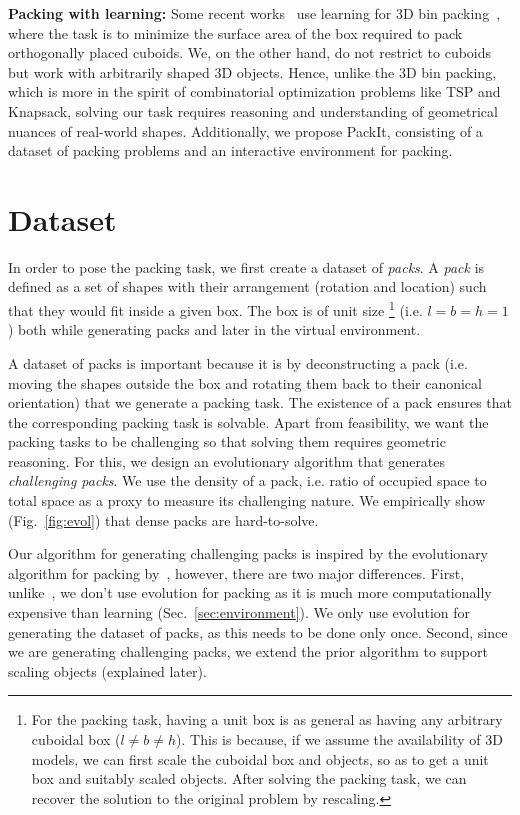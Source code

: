 \documentclass{article}
\begin{document}
\noindent \textbf{Packing with learning:} Some recent works~\cite{hu2017solving,laterre2018ranked} use learning for 3D bin packing~\cite{martello2000three}, where the task is to minimize the surface area of the box required to pack orthogonally placed cuboids. We, on the other hand, do not restrict to cuboids but work with arbitrarily shaped 3D objects. Hence, unlike the 3D bin packing, which is more in the spirit of combinatorial optimization problems like TSP and Knapsack, solving our task requires reasoning and understanding of geometrical nuances of real-world shapes. Additionally, we propose PackIt, consisting of a dataset of packing problems and an interactive environment for packing.

\section{Dataset}
\label{sec:dataset}
In order to pose the packing task, we first create a dataset of \textit{packs}. A \textit{pack} is defined as a set of shapes with their arrangement (rotation and location) such that they would fit inside a given box. The box is of unit size \footnote{ \label{box} For the packing task, having a unit box is as general as having any arbitrary cuboidal box ($l \neq b \neq h$). This is because, if we assume the availability of 3D models, we can first scale the cuboidal box and objects, so as to get a unit box and suitably scaled objects. After solving the packing task, we can recover the solution to the original problem by rescaling.} (i.e. $l=b=h=1$) both while generating packs and later in the virtual environment.

A dataset of packs is important because it is by deconstructing a pack (i.e. moving the shapes outside the box and rotating them back to their canonical orientation) that we generate a packing task. The existence of a pack ensures that the corresponding packing task is solvable. Apart from feasibility, we want the packing tasks to be challenging so that solving them requires geometric reasoning. For this, we design an evolutionary algorithm that generates \textit{challenging packs}. We use the density of a pack, i.e. ratio of occupied space to total space as a proxy to measure its challenging nature. We empirically show (Fig.~\ref{fig:evol}) that dense packs are hard-to-solve.

Our algorithm for generating challenging packs is inspired by the evolutionary algorithm for packing by~\citet{tiwari2010fast}, however, there are two major differences.  First, unlike~\cite{tiwari2010fast}, we don't use evolution for packing as it is much more computationally expensive than learning (Sec.~\ref{sec:environment}). We only use evolution for generating the dataset of packs, as this needs to be done only once. Second, since we are generating challenging packs, we extend the prior algorithm to support scaling objects (explained later).
\end{document}
